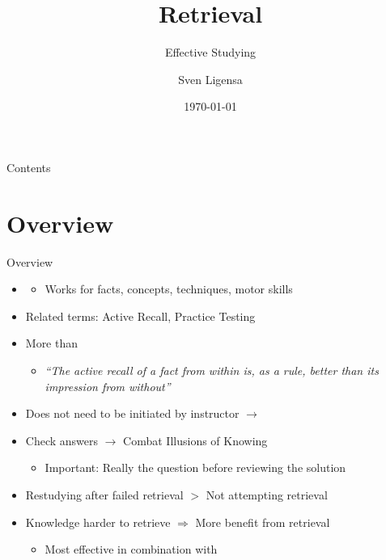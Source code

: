 \documentclass{ercisbeamer}
\title{Retrieval}
\subtitle{Effective Studying}
\author{Sven Ligensa}
\institute{European Research Center for Information Systems (ERCIS)}
\date{\today}
\begin{document}
\begin{frame}
    \begin{tbox}
        \titlepage
    \end{tbox}
\end{frame}
\setbgimage{}

\begin{frame}{Contents}
    \tableofcontents
\end{frame}


\section{Overview}
\begin{frame}{Overview}
    \begin{itemize}
        \item {}
        \begin{itemize}
            \item Works for facts, concepts, techniques, motor skills
        \end{itemize}
        \item Related terms: Active Recall, Practice Testing
        \item More than 
        \begin{itemize}
            \item \emph{``The active recall of a fact from within is, as a rule, better than its impression from without'' }
        \end{itemize}
        \item Does not need to be initiated by instructor $\rightarrow$ 
        \item Check answers $\rightarrow$ Combat Illusions of Knowing 
        \begin{itemize}
            \item Important: Really  the question before reviewing the solution
        \end{itemize}
        \item Restudying after failed retrieval $>$ Not attempting retrieval
        \item Knowledge harder to retrieve $\Rightarrow$ More benefit from retrieval
        \begin{itemize}
            \item Most effective in combination with 
        \end{itemize}
    \end{itemize}
\end{frame}
\end{document}
